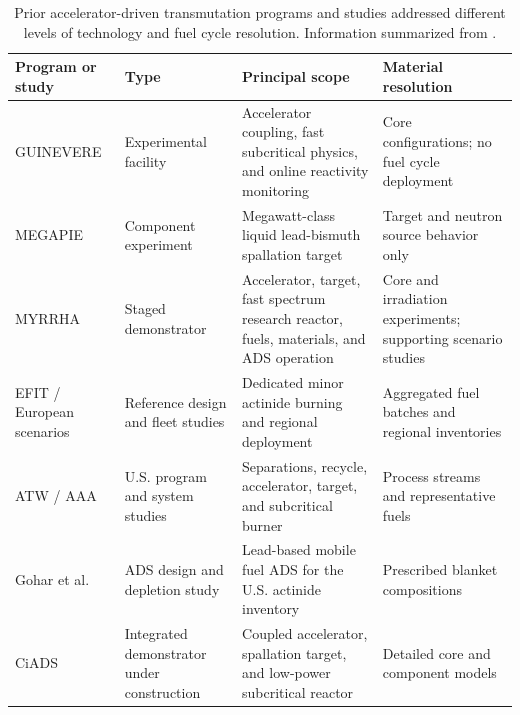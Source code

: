 \begin{table}[htbp]
    \centering
    \caption{Prior accelerator-driven transmutation programs and studies
    addressed different levels of technology and fuel cycle resolution.
    Information summarized from
    \cite{dordaImplementationStatusMyrrha2024,billebaud_guinevere_2009,
    wagner_megapie_2008,gohar_ads_2021,
    wang_transient_2023,nea_regional_scenarios_2009,
    rodriguez_nuclear_2020}.}
    \label{tab:prior-ads-studies}

    \begin{tabularx}{\textwidth}{@{}p{2.0cm}p{2.3cm}Xp{2.5cm}@{}}
        \toprule
        \textbf{Program or study}
        & \textbf{Type}
        & \textbf{Principal scope}
        & \textbf{Material resolution} \\
        \midrule

        \gls{GUINEVERE}
        & Experimental facility
        & Accelerator coupling, fast subcritical physics, and online
          reactivity monitoring
        & Core configurations; no fuel cycle deployment \\

        \gls{MEGAPIE}
        & Component experiment
        & Megawatt-class liquid lead-bismuth spallation target
        & Target and neutron source behavior only \\

        \gls{MYRRHA}
        & Staged demonstrator
        & Accelerator, target, fast spectrum research reactor, fuels,
          materials, and \gls{ADS} operation
        & Core and irradiation experiments; supporting scenario studies \\

        \gls{EFIT} / European scenarios
        & Reference design and fleet studies
        & Dedicated minor actinide burning and regional deployment
        & Aggregated fuel batches and regional inventories \\

        \gls{ATW} / \gls{AAA}
        & U.S. program and system studies
        & Separations, recycle, accelerator, target, and subcritical burner
        & Process streams and representative fuels \\

        Gohar et al.
        & \gls{ADS} design and depletion study
        & Lead-based mobile fuel \gls{ADS} for the U.S. actinide inventory
        & Prescribed blanket compositions \\

        CiADS
        & Integrated demonstrator under construction
        & Coupled accelerator, spallation target, and low-power
          subcritical reactor
        & Detailed core and component models \\


\end{tabularx}
\end{table}
